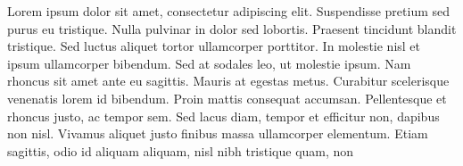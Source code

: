 \documentclass[10pt]{article}
\begin{document}
Lorem ipsum dolor sit amet, consectetur adipiscing elit. Suspendisse pretium sed purus eu tristique. Nulla pulvinar in dolor sed lobortis. Praesent tincidunt blandit tristique. Sed luctus aliquet tortor ullamcorper porttitor. In molestie nisl et ipsum ullamcorper bibendum. Sed at sodales leo, ut molestie ipsum. Nam rhoncus sit amet ante eu sagittis. Mauris at egestas metus. Curabitur scelerisque venenatis lorem id bibendum. Proin mattis consequat accumsan. Pellentesque et rhoncus justo, ac tempor sem. Sed lacus diam, tempor et efficitur non, dapibus non nisl. Vivamus aliquet justo finibus massa ullamcorper elementum. Etiam sagittis, odio id aliquam aliquam, nisl nibh tristique quam, non\\




\end{document}

